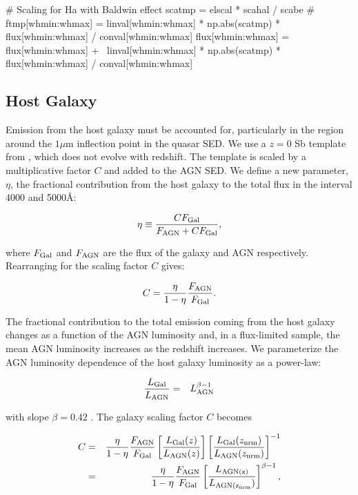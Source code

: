     # Scaling for Ha with Baldwin effect 
    scatmp = elscal * scahal / scabe
    # ftmp[whmin:whmax] = linval[whmin:whmax] * np.abs(scatmp) * flux[whmin:whmax] / conval[whmin:whmax] 
    flux[whmin:whmax] = flux[whmin:whmax] + \
                        linval[whmin:whmax] * np.abs(scatmp) * flux[whmin:whmax] / conval[whmin:whmax] 


\subsection{Host Galaxy}

Emission from the host galaxy must be accounted for, particularly in the region around the $1\mu$m inflection point in the quasar SED. 
We use a $z=0$ Sb template from \citet{mannucci01}, which does not evolve with redshift.
The template is scaled by a multiplicative factor $C$ and added to the \ac{AGN} \ac{SED}. 
We define a new parameter, $\eta$, the fractional contribution from the host galaxy to the total flux in the interval 4000 and 5000\AA:

\begin{eqnarray}
  \eta \equiv \frac{CF_{\rm Gal}}{F_{\rm AGN} + CF_{\rm Gal}},
\end{eqnarray}

where $F_{\rm Gal}$ and $F_{\rm AGN}$ are the flux of the galaxy and \ac{AGN} respectively. 
Rearranging for the scaling factor $C$ gives:

\begin{eqnarray}
  C = \frac{\eta}{1 - \eta} \frac{F_{\rm AGN}}{F_{\rm Gal}}.
\end{eqnarray}

The fractional contribution to the total emission coming from the host galaxy changes as a function of the \ac{AGN} luminosity and, in a flux-limited sample, the mean \ac{AGN} luminosity increases as the redshift increases. 
We parameterize the \ac{AGN} luminosity dependence of the host galaxy luminosity as a power-law:

\begin{eqnarray}
  \label{eq:lgal}
  \frac{L_{\rm Gal}}{L_{\rm AGN}} &=& L_{\rm AGN}^{\beta - 1} 
\end{eqnarray}

with slope $\beta=0.42$ \citep{maddox06}. 
The galaxy scaling factor $C$ becomes 

\begin{eqnarray}
  C &=& \frac{\eta}{1 - \eta} \frac{F_{\rm AGN}}{F_{\rm Gal}} \left[ \frac{ L_{\rm Gal}(z)} {L_{\rm AGN}(z)} \right] \left[ \frac{ L_{\rm Gal}(z_{\rm nrm})} {L_{\rm AGN}(z_{\rm nrm})} \right]^{-1} \\
  &=& \frac{\eta}{1 - \eta} \frac{F_{\rm AGN}}{F_{\rm Gal}} \left[ \frac{L_{\rm AGN(z)}} {L_{\rm AGN(z_{\rm nrm}})} \right]^{\beta -1}, 
\end{eqnarray}


